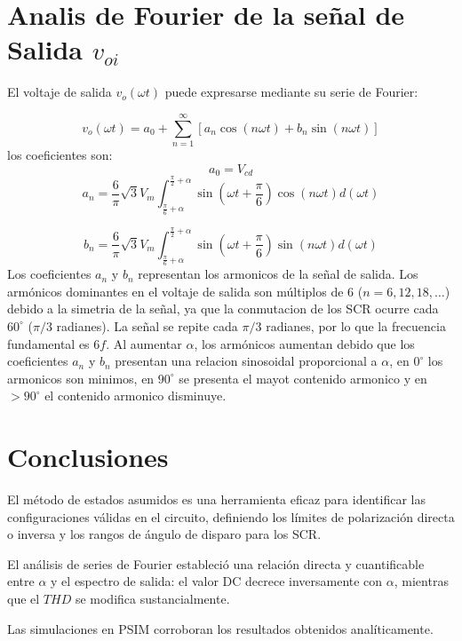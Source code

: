 \documentclass[conference]{IEEEtran}
\begin{document}
\section{Analis de Fourier de la señal de Salida $v_{oi}$}
El voltaje de salida \(v_o(\omega t)\) puede expresarse mediante su serie de Fourier:

\[
v_o(\omega t) = a_0 + \sum_{n=1}^{\infty} \left[a_n \cos(n\omega t) + b_n \sin(n\omega t)\right]
\]
los coeficientes son:
\[
a_0 = V_{cd}
\]
\[
a_n = \frac{6}{\pi} \sqrt{3} V_m \int_{\frac{\pi}{6} + \alpha}^{\frac{\pi}{2} + \alpha} \sin\left(\omega t + \frac{\pi}{6}\right) \cos(n\omega t)  d(\omega t)
\]

\[
b_n = \frac{6}{\pi} \sqrt{3} V_m \int_{\frac{\pi}{6} + \alpha}^{\frac{\pi}{2} + \alpha} \sin\left(\omega t + \frac{\pi}{6}\right) \sin(n\omega t)  d(\omega t)
\]
Los coeficientes $a_{n}$ y $b_{n}$ representan los armonicos de la señal de salida. 
Los armónicos dominantes en el voltaje de salida son múltiplos de 6 (\(n = 6, 12, 18, \ldots\)) 
debido a la simetria de la señal, ya que la conmutacion de los SCR ocurre cada \(60^\circ\) 
(\(\pi/3\) radianes). La señal se repite cada \(\pi/3\) radianes, por lo que la frecuencia 
fundamental es \(6f\).  Al aumentar \(\alpha\), los armónicos aumentan debido que los coeficientes 
 $a_{n}$ y $b_{n}$ presentan una relacion sinosoidal proporcional a \(\alpha\), en \(0^\circ\) los armonicos 
 son minimos, en \(90^\circ\) se presenta el mayot contenido armonico y en \(>90^\circ\) el contenido armonico
 disminuye. 


\section{Conclusiones}
El método de estados asumidos es una herramienta eficaz para identificar las configuraciones válidas en el circuito, definiendo los límites de polarización directa o inversa
y los rangos de ángulo de disparo para los SCR.

El análisis de series de Fourier estableció una relación directa y cuantificable entre $\alpha$ y el espectro de salida: el valor DC decrece inversamente con $\alpha$,
mientras que el $THD$ se modifica sustancialmente.

Las simulaciones en PSIM corroboran los resultados obtenidos analíticamente.
\end{document}

